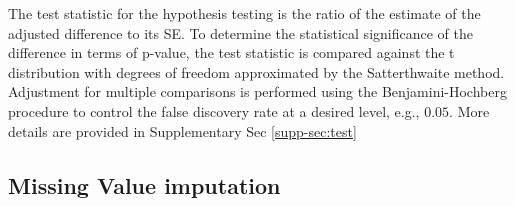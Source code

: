 \documentclass[mcp]{article}
\numberwithin{figure}{section} %
\numberwithin{table}{section}
\begin{document}
The test statistic for the hypothesis testing is the ratio of the estimate of the adjusted difference to its SE. To determine the statistical significance of the difference in terms of p-value, the test statistic is compared against the t distribution with degrees of freedom approximated by the Satterthwaite method. \cite{satterthwaite:1946} Adjustment for multiple comparisons is performed using the Benjamini-Hochberg procedure to control the false discovery rate at a desired level, e.g., $0.05$.\cite{Benjamini:1995} More details are provided in Supplementary Sec \ref{supp-sec:test}



\subsection*{Missing Value imputation}
\end{document}
